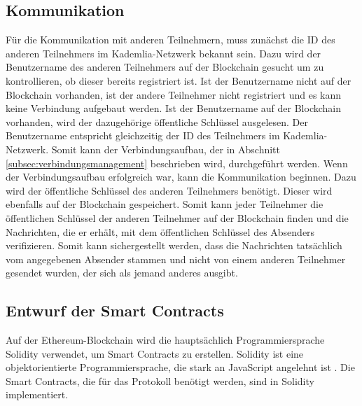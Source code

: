 \subsection{Kommunikation}
Für die Kommunikation mit anderen Teilnehmern, muss zunächst die ID des anderen Teilnehmers im Kademlia-Netzwerk bekannt sein. Dazu wird der Benutzername des anderen Teilnehmers auf der Blockchain gesucht um zu kontrollieren, ob dieser bereits registriert ist. Ist der Benutzername nicht auf der Blockchain vorhanden, ist der andere Teilnehmer nicht registriert und es kann keine Verbindung aufgebaut werden. Ist der Benutzername auf der Blockchain vorhanden, wird der dazugehörige öffentliche Schlüssel ausgelesen. Der Benutzername entspricht gleichzeitig der ID des Teilnehmers im Kademlia-Netzwerk. Somit kann der Verbindungsaufbau, der in Abschnitt \ref{subsec:verbindungsmanagement}  beschrieben wird, durchgeführt werden.
Wenn der Verbindungsaufbau erfolgreich war, kann die Kommunikation beginnen. Dazu wird der öffentliche Schlüssel des anderen Teilnehmers benötigt. Dieser wird ebenfalls auf der Blockchain gespeichert. Somit kann jeder Teilnehmer die öffentlichen Schlüssel der anderen Teilnehmer auf der Blockchain finden und die Nachrichten, die er erhält, mit dem öffentlichen Schlüssel des Absenders verifizieren. Somit kann sichergestellt werden, dass die Nachrichten tatsächlich vom angegebenen Absender stammen und nicht von einem anderen Teilnehmer gesendet wurden, der sich als jemand anderes ausgibt.

\subsection{Entwurf der Smart Contracts}
\label{subsec:smartcontracts}

Auf der Ethereum-Blockchain wird die hauptsächlich Programmiersprache Solidity verwendet, um Smart Contracts zu erstellen. Solidity ist eine objektorientierte Programmiersprache, die stark an JavaScript angelehnt ist \parencite[S. 131]{Antonopoulos_MasteringEthereum}. Die Smart Contracts, die für das Protokoll benötigt werden, sind in Solidity implementiert.



